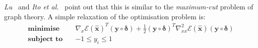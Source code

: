 \documentclass[a4paper,twoside,10pt,english]{report}
\begin{document}
\emph{Lu}~\cite{Lu_FIRDiscreteCoefficientsSphereRelaxation} and
\emph{Ito et al.}~\cite{Ito_FIRSP2CoefficientsRelaxationTriangleInequalities}
point out that this is similar to the \emph{maximum-cut} problem of graph 
theory. A simple relaxation of the optimisation problem is:
\begin{align*}
\textbf{minimise}\quad&
\nabla_{x}\mathcal{E}\left(\boldsymbol{\hat{x}}\right)^{T}
\left(\boldsymbol{y}\circ\boldsymbol{\delta}\right) + 
\frac{1}{2}\left(\boldsymbol{y}\circ\boldsymbol{\delta}\right)^{T}
\nabla_{xx}^{2}\mathcal{E}\left(\boldsymbol{\hat{x}}\right)
\left(\boldsymbol{y}\circ\boldsymbol{\delta}\right)\\
\textbf{subject to}\quad&-1 \le y_{i} \le 1
\end{align*}

\begin{comment}
\emph{Goemans} and
\emph{Williamson}~\cite{GoemansWilliamson_ImprovedApproximationMaximumCut}
describe a randomised approximation algorithm for the maximum-cut problem.
They show that their algorithm will ``deliver solutions of expected value at 
least .87856 times the optimal value''. 


\end{comment}
\end{document}
